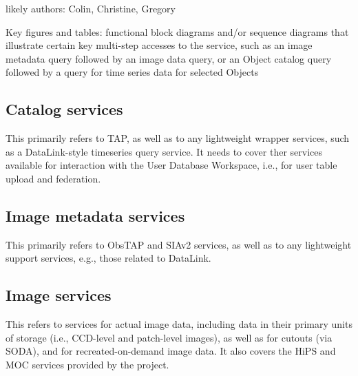 likely authors: Colin, Christine, Gregory


Key figures and tables: functional block diagrams and/or sequence diagrams that illustrate certain key multi-step accesses to the service, such as an image metadata query followed by an image data query, or an Object catalog query followed by a query for time series data for selected Objects

\subsection{Catalog services}

This primarily refers to TAP, as well as to any lightweight wrapper services, such as a DataLink-style timeseries query service.  It needs to cover ther services available for interaction with the User Database Workspace, i.e., for user table upload and federation.

\subsection{Image metadata services}

This primarily refers to ObsTAP and SIAv2 services, as well as to any lightweight support services, e.g., those related to DataLink.

\subsection{Image services}

This refers to services for actual image data, including data in their primary units of storage (i.e., CCD-level and patch-level images), as well as for cutouts (via SODA), and for recreated-on-demand image data.  It also covers the HiPS and MOC services provided by the project.

